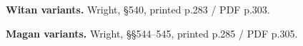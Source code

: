 \textbf{Witan variants.} Wright, §540, printed p.283 /\allowbreak{} PDF p.303.

\textbf{Magan variants.} Wright, §§544–545, printed p.285 /\allowbreak{} PDF p.305.

\endgroup

\par\label{end-ch06-learner}
\clearpage\endgroup
